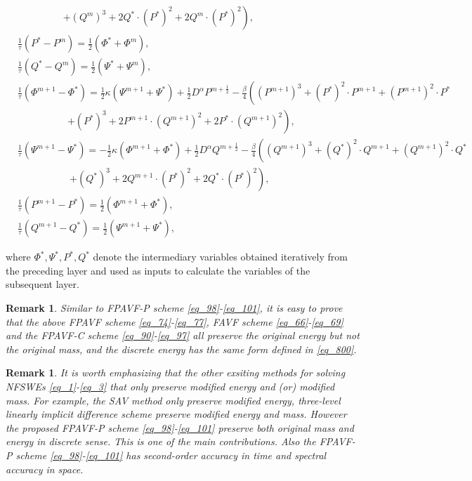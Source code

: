\documentclass[preprint,compress,3p,10pt,fleqn]{elsarticle}
\numberwithin{equation}{section}
\newtheorem{remark}[theorem]{Remark}
\begin{document}
\begin{enumerate}[$\bullet$]
\begin{align}
		&~~~~~~~~~~~~~~~~~~~~~\left.+ (Q^{m})^{3}+2 Q^{*}\cdot (P^{*})^{2}+2 Q^{m}\cdot (P^{*})^{2}\right),\label{eq_91}\\
&\frac{1}{\tau}\left(P^{*}-P^{m}\right)=\frac{1}{2}(\varPhi^{*}+\varPhi^{m}),\label{eq_92}\\
&\frac{1}{\tau}\left(Q^{*}-Q^{m}\right)=\frac{1}{2}(\Psi^{*}+\Psi^{m}),\label{eq_93}\\
&\frac{1}{\tau}\left(\varPhi^{m+1}-\varPhi^{*}\right)=\frac{1}{2}\kappa (\Psi^{m+1}+\Psi^{*})+\frac{1}{2}D^{\alpha} P^{m+\frac{1}{2}}-\frac{\beta}{4}\left((P^{m+1})^3+(P^{*})^{2}\cdot P^{m+1}+(P^{m+1})^{2}\cdot P^{*}\right.\nonumber\\
		&~~~~~~~~~~~~~~~~~~~~~~~\left.+ (P^{*})^{3}+2 P^{m+1}\cdot (Q^{m+1})^{2}+2 P^{*}\cdot (Q^{m+1})^{2}\right),\label{eq_94}\\
&\frac{1}{\tau}\left(\Psi^{m+1}-\Psi^{*}\right)=-\frac{1}{2}\kappa (\varPhi^{m+1}+\varPhi^{*})+\frac{1}{2}D^{\alpha} Q^{m+\frac{1}{2}}-\frac{\beta}{4}\left((Q^{m+1})^3+(Q^{*})^{2}\cdot Q^{m+1}+(Q^{m+1})^{2}\cdot Q^{*}\right.\nonumber\\
		&~~~~~~~~~~~~~~~~~~~~~~~~\left.+ (Q^{*})^{3}+2 Q^{m+1}\cdot (P^{*})^{2}+2 Q^{*}\cdot (P^{*})^{2}\right),\label{eq_95}\\
&\frac{1}{\tau}\left(P^{m+1}-P^{*}\right)=\frac{1}{2}(\varPhi^{m+1}+\varPhi^{*}),\label{eq_96}\\
&\frac{1}{\tau}\left(Q^{m+1}-Q^{*}\right)=\frac{1}{2}(\Psi^{m+1}+\Psi^{*}),\label{eq_97}
\end{align}
\end{enumerate}
 where $\Phi^*, \Psi^*, P^*, Q^*$ denote the intermediary variables obtained iteratively from the preceding layer and used as inputs to calculate the variables of the subsequent layer.

\begin{remark}\label{rmk1}
Similar to FPAVF-P scheme \eqref{eq_98}-\eqref{eq_101}, it is easy to prove that the above FPAVF scheme \eqref{eq_74}-\eqref{eq_77}, FAVF scheme \eqref{eq_66}-\eqref{eq_69} and the FPAVF-C scheme \eqref{eq_90}-\eqref{eq_97} all preserve the original energy but not the original mass, and the discrete energy has the same form defined in \eqref{eq_800}.
\end{remark}

\begin{remark}\label{rmk2}
It is worth emphasizing that the other exsiting methods for solving NFSWEs \eqref{eq_1}-\eqref{eq_3} that only preserve modified energy and (or) modified mass. For example, the SAV method \cite{chengConvergenceEnergyconservingScheme2022} only preserve modified energy, three-level linearly implicit difference scheme \cite{ranLinearlyImplicitConservative2016} preserve modified energy and mass. However the proposed FPAVF-P scheme \eqref{eq_98}-\eqref{eq_101} preserve both original mass and energy in discrete sense. This is one of the main contributions. Also the FPAVF-P scheme \eqref{eq_98}-\eqref{eq_101} has second-order accuracy in time and spectral accuracy in space.
\end{remark}
\end{document}
